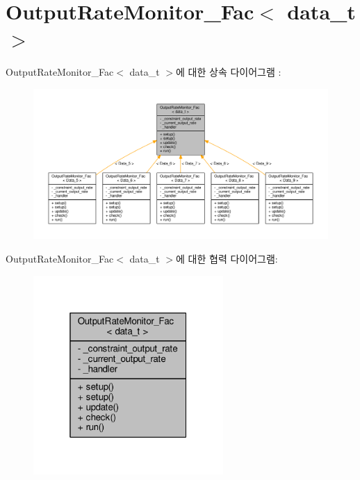 \hypertarget{classOutputRateMonitor__Fac}{}\section{Output\+Rate\+Monitor\+\_\+\+Fac$<$ data\+\_\+t $>$}
\label{classOutputRateMonitor__Fac}


Output\+Rate\+Monitor\+\_\+\+Fac$<$ data\+\_\+t $>$에 대한 상속 다이어그램 \+: \nopagebreak
\begin{figure}[H]
\begin{center}
\leavevmode
\includegraphics[width=350pt]{classOutputRateMonitor__Fac__inherit__graph}
\end{center}
\end{figure}


Output\+Rate\+Monitor\+\_\+\+Fac$<$ data\+\_\+t $>$에 대한 협력 다이어그램\+:\nopagebreak
\begin{figure}[H]
\begin{center}
\leavevmode
\includegraphics[width=205pt]{classOutputRateMonitor__Fac__coll__graph}
\end{center}
\end{figure}
